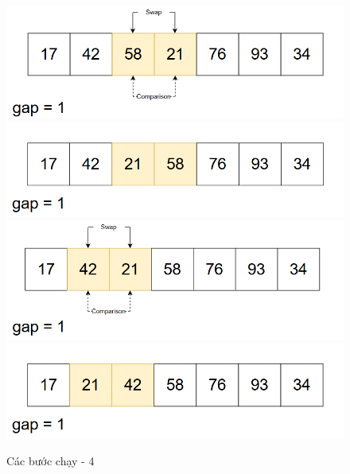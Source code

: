 \begin{figure}[H]
    \centering
    \includegraphics[width=1\linewidth]{img/shell_sort/13.png}
    \vspace{0.15cm}
    \includegraphics[width=1\linewidth]{img/shell_sort/14.png}
    \vspace{0.15cm}
    \includegraphics[width=1\linewidth]{img/shell_sort/15.png}
    \vspace{0.15cm}
    \includegraphics[width=1\linewidth]{img/shell_sort/16.png}
    \caption{Các bước chạy - 4}
    \label{fig:part4}
\end{figure}

